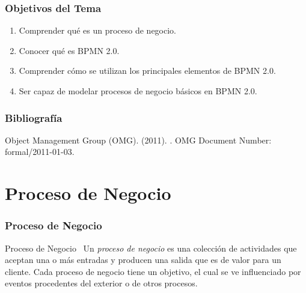 \documentclass[handout,a4paper,slidestop,xcolor=pst,blue]{beamer}
\begin{document}
\begin{frame}[c]
    \frametitle{Objetivos del Tema}
    \begin{enumerate}[<+->]
         \item Comprender qué es un proceso de negocio.
         \item Conocer qué es BPMN 2.0.
         \item Comprender cómo se utilizan los principales elementos de BPMN 2.0.
         \item Ser capaz de modelar procesos de negocio básicos en BPMN 2.0.
    \end{enumerate}
\end{frame}

\begin{frame}[c]
    \frametitle{Bibliografía}
    \begin{thebibliography}{1}
        Object Management Group (OMG). (2011).
        .
        \newblock OMG Document Number: formal/2011-01-03.
    \end{thebibliography}
\end{frame}

\section{Proceso de Negocio}

\begin{frame}[c]
    \frametitle{Proceso de Negocio}
    \begin{block}{Proceso de Negocio~\cite{hammer:1993}}
        Un \emph{proceso de negocio} es una colección de actividades que aceptan una o más entradas y producen una salida que es de valor para un cliente. Cada proceso de negocio tiene un objetivo, el cual se ve influenciado por eventos procedentes del exterior o de otros procesos.
    \end{block}
\end{frame}
\end{document}
